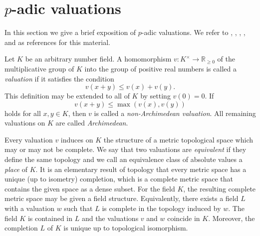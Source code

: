 \section{$p$-adic valuations}
\label{sec:pAdicValuations}

In this section we give a brief exposition of $p$-adic valuations. We refer to \cite{BS}, \cite{Ca}, \cite{Has2}, \cite{Ko}, and \cite{Nark} as references for this material. 

Let $K$ be an arbitrary number field. A homomorphism $v: K^{\times} \to \mathbb{R}_{\geq 0}$ of the multiplicative group of $K$ into the group of positive real numbers is called a \textit{valuation} if it satisfies the condition
\[v(x+y) \leq v(x) + v(y).\]
This definition may be extended to all of $K$ by setting $v(0) = 0$. If
\[v(x+y) \leq \max(v(x),v(y))\]
holds for all $x,y \in K$, then $v$ is called a \textit{non-Archimedean valuation}. All remaining valuations on $K$ are called \textit{Archimedean}. 

Every valuation $v$ induces on $K$ the structure of a metric topological space which may or may not be complete. We say that two valuations are \textit{equivalent} if they define the same topology and we call an equivalence class of absolute values a \textit{place} of $K$. It is an elementary result of topology that every metric space has a unique (up to isometry) completion, which is a complete metric space that contains the given space as a dense subset. For the field $K$, the resulting complete metric space may be given a field structure. Equivalently, there exists a field $L$ with a valuation $w$ such that $L$ is complete in the topology induced by $w$. The field $K$ is contained in $L$ and the valuations $v$ and $w$ coincide in $K$. Moreover, the completion $L$ of $K$ is unique up to topological isomorphism.


